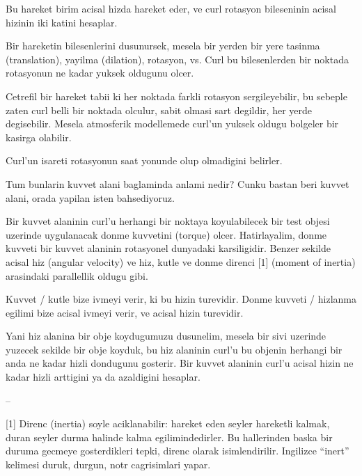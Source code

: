 \documentclass[12pt,fleqn]{article}\usepackage{../common}
\begin{document}
Bu hareket birim acisal hizda hareket eder, ve curl rotasyon bileseninin
acisal hizinin iki katini hesaplar.

Bir hareketin bilesenlerini dusunursek, mesela bir yerden bir yere tasinma
(translation), yayilma (dilation), rotasyon, vs. Curl bu bilesenlerden
bir noktada rotasyonun ne kadar yuksek oldugunu olcer. 

Cetrefil bir hareket tabii ki her noktada farkli rotasyon sergileyebilir,
bu sebeple zaten curl belli bir noktada olculur, sabit olmasi sart
degildir, her yerde degisebilir. Mesela atmosferik modellemede curl'un
yuksek oldugu bolgeler bir kasirga olabilir. 

Curl'un isareti rotasyonun saat yonunde olup olmadigini belirler. 

Tum bunlarin kuvvet alani baglaminda anlami nedir? Cunku bastan beri kuvvet
alani, orada yapilan isten bahsediyoruz. 

Bir kuvvet alaninin curl'u herhangi bir noktaya koyulabilecek bir test
objesi uzerinde uygulanacak donme kuvvetini (torque) olcer. Hatirlayalim,
donme kuvveti bir kuvvet alaninin rotasyonel dunyadaki karsiligidir. Benzer
sekilde acisal hiz (angular velocity) ve hiz, kutle ve donme direnci [1]
(moment of inertia) arasindaki parallellik oldugu gibi. 

Kuvvet / kutle bize ivmeyi verir, ki bu hizin turevidir. Donme kuvveti /
hizlanma egilimi bize acisal ivmeyi verir, ve acisal hizin turevidir. 

Yani hiz alanina bir obje koydugumuzu dusunelim, mesela bir sivi uzerinde
yuzecek sekilde bir obje koyduk, bu hiz alaninin curl'u bu objenin herhangi
bir anda ne kadar hizli dondugunu gosterir. Bir kuvvet alaninin curl'u
acisal hizin ne kadar hizli arttigini ya da azaldigini hesaplar.

--

[1] Direnc (inertia) soyle aciklanabilir: hareket eden seyler hareketli
kalmak, duran seyler durma halinde kalma egilimindedirler. Bu hallerinden
baska bir duruma gecmeye gosterdikleri tepki, direnc olarak
isimlendirilir. Ingilizce ``inert'' kelimesi duruk, durgun, notr
cagrisimlari yapar. 
\end{document}
